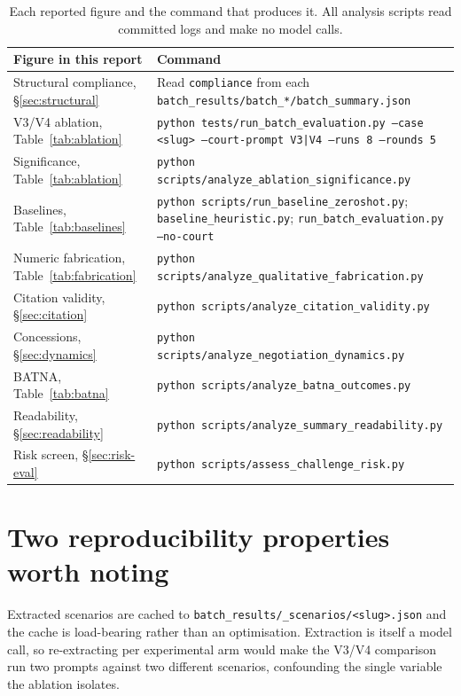 \begin{table}[htbp]
\centering
\footnotesize
\caption[Reproduction commands]{Each reported figure and the command that
produces it. All analysis scripts read committed logs and make no model calls.}
\begin{tabular}{@{}p{5.0cm}p{7.4cm}@{}}
\toprule
\textbf{Figure in this report} & \textbf{Command} \\
\midrule
Structural compliance, \S\ref{sec:structural} &
  Read \texttt{compliance} from each \texttt{batch\_results/batch\_*/batch\_summary.json} \\
V3/V4 ablation, Table~\ref{tab:ablation} &
  \texttt{python tests/run\_batch\_evaluation.py --case <slug> --court-prompt V3|V4 --runs 8 --rounds 5} \\
Significance, Table~\ref{tab:ablation} &
  \texttt{python scripts/analyze\_ablation\_significance.py} \\
Baselines, Table~\ref{tab:baselines} &
  \texttt{python scripts/run\_baseline\_zeroshot.py}; \texttt{baseline\_heuristic.py}; \texttt{run\_batch\_evaluation.py --no-court} \\
Numeric fabrication, Table~\ref{tab:fabrication} &
  \texttt{python scripts/analyze\_qualitative\_fabrication.py} \\
Citation validity, \S\ref{sec:citation} &
  \texttt{python scripts/analyze\_citation\_validity.py} \\
Concessions, \S\ref{sec:dynamics} &
  \texttt{python scripts/analyze\_negotiation\_dynamics.py} \\
BATNA, Table~\ref{tab:batna} &
  \texttt{python scripts/analyze\_batna\_outcomes.py} \\
Readability, \S\ref{sec:readability} &
  \texttt{python scripts/analyze\_summary\_readability.py} \\
Risk screen, \S\ref{sec:risk-eval} &
  \texttt{python scripts/assess\_challenge\_risk.py} \\
\bottomrule
\end{tabular}
\end{table}

\section{Two reproducibility properties worth noting}

Extracted scenarios are cached to \texttt{batch\_results/\_scenarios/<slug>.json}
and the cache is load-bearing rather than an optimisation. Extraction is itself a
model call, so re-extracting per experimental arm would make the V3/V4 comparison
run two prompts against two different scenarios, confounding the single variable
the ablation isolates.

